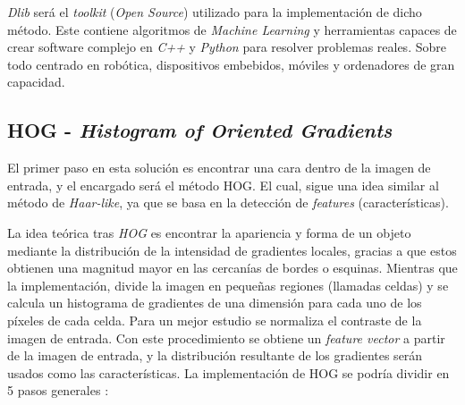 \textit{Dlib} será el \textit{toolkit} (\textit{Open Source}) utilizado para la implementación de dicho método. Este contiene algoritmos de \textit{Machine Learning} y herramientas capaces de crear software complejo en \textit{C++} y \textit{Python} para resolver problemas reales. Sobre todo centrado en robótica, dispositivos embebidos, móviles y ordenadores de gran capacidad. \cite{dlib}

\subsection*{HOG - \textit{Histogram of Oriented Gradients}}

El primer paso en esta solución es encontrar una cara dentro de la imagen de entrada, y el encargado será el método HOG. El cual, sigue una idea similar al método de \textit{Haar-like}, ya que se basa en la detección de \textit{features} (características).

La idea teórica tras \textit{HOG} es encontrar la apariencia y forma de un objeto mediante la distribución de la intensidad de gradientes locales, gracias a que estos obtienen una magnitud mayor en las cercanías de bordes o esquinas. Mientras que la implementación, divide la imagen en pequeñas regiones (llamadas celdas) y se calcula un histograma de gradientes de una dimensión para cada uno de los píxeles de cada celda. Para un mejor estudio se normaliza el contraste de la imagen de entrada. \cite{hog} Con este procedimiento se obtiene un \textit{feature vector} a partir de la imagen de entrada, y la distribución resultante de los gradientes serán usados como las características. La implementación de HOG se podría dividir en 5 pasos generales \cite{hog2}:

